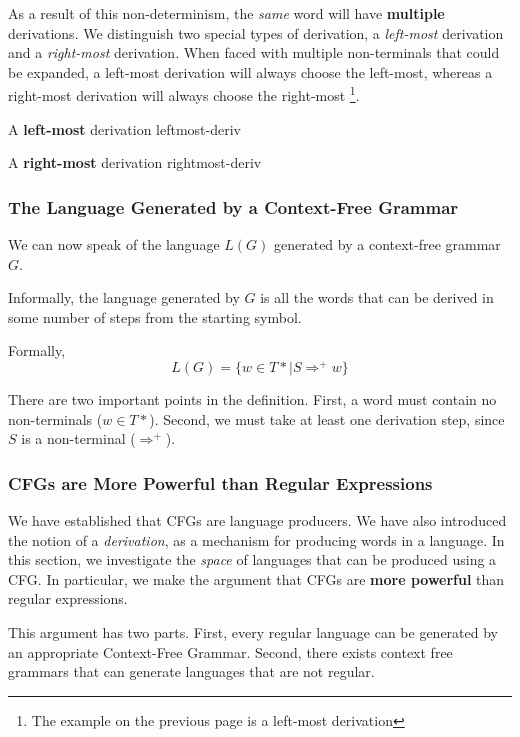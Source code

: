 As a result of this non-determinism, the \textit{same} word will have \textbf{multiple} derivations. We distinguish two special types of derivation, a \textit{left-most} derivation and a \textit{right-most} derivation. When faced with multiple non-terminals that could be expanded, a left-most derivation will always choose the left-most, whereas a right-most derivation will always choose the right-most \footnote{The example on the previous page is a left-most derivation}. \label{definition:leftmostderivation}

\begin{minipage}[t]{.5\textwidth}
    A \textbf{left-most} derivation
    {leftmost-deriv}
\end{minipage}%
\begin{minipage}[t]{.5\textwidth}
    A \textbf{right-most} derivation
    {rightmost-deriv}
\end{minipage}

\subsubsection{The Language Generated by a Context-Free Grammar}
We can now speak of the language $L(G)$ generated by a context-free grammar $G$.

Informally, the language generated by $G$ is all the words that can be derived in some number of steps from the starting symbol. 

Formally, 
\[L(G) = \{w \in T* \mid S \Rightarrow^{+} w \}\]

There are two important points in the definition. First, a word must contain no non-terminals ($w \in T*$). Second, we must take at least one derivation step, since $S$ is a non-terminal ($\Rightarrow^{+}$). 

\subsubsection{CFGs are More Powerful than Regular Expressions}
We have established that CFGs are language producers. We have also introduced the notion of a \textit{derivation}, as a mechanism for producing words in a language. In this section, we investigate the \textit{space} of languages that can be produced using a CFG. In particular, we make the argument that CFGs are \textbf{more powerful} than regular expressions. 

This argument has two parts. First, every regular language can be generated by an appropriate Context-Free Grammar. Second, there exists context free grammars that can generate languages that are not regular. 

